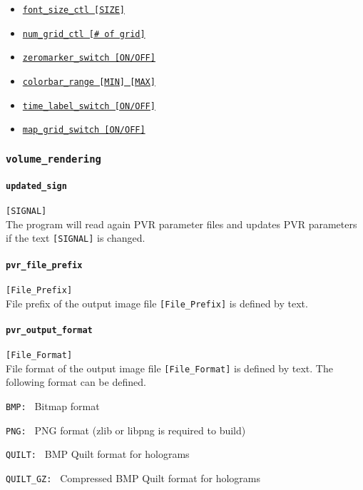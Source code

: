 \begin{itemize}
\begin{itemize}
					{\tt colorbar\_scale\_ctl    [ON/OFF]}
			\item \hyperref[href_t:font_size_ctl]
					{\tt font\_size\_ctl    [SIZE]}
			\item \hyperref[href_t:num_grid_ctl]
					{\tt num\_grid\_ctl    [\# of grid]}
			\item \hyperref[href_t:zeromarker_switch]
					{\tt zeromarker\_switch    [ON/OFF]}
			\item \hyperref[href_t:colorbar_range]
					{\tt colorbar\_range    [MIN]  [MAX]}
			\item \hyperref[href_t:time_label_switch]
					{\tt time\_label\_switch    [ON/OFF]}
			\item \hyperref[href_t:map_grid_switch]
					{\tt map\_grid\_switch    [ON/OFF]}
		\end{itemize}
\end{itemize}



\subsubsection{\tt volume\_rendering}
\label{href_t:volume_rendering}
%
\paragraph{\tt updated\_sign}
\label{href_t:updated_sign}  
\verb|[SIGNAL]| \\
The program will read again PVR parameter files and updates PVR parameters if the text \verb|[SIGNAL]| is changed. 
%
\paragraph{\tt pvr\_file\_prefix}
\label{href_t:pvr_file_prefix}  
\verb|[File_Prefix]| \\
File prefix of the output image file  \verb|[File_Prefix]| is defined by text. 
%
\paragraph{\tt pvr\_output\_format}
\label{href_t:pvr_output_format}  
\verb|[File_Format]| \\
File format of the output image file  \verb|[File_Format]| is defined by text.  The following format can be defined.
\begin{description}
\item{\tt BMP: }               Bitmap format
\item{\tt PNG: }               PNG format  (zlib or libpng is required to build)
\item{\tt QUILT: }             BMP Quilt format for holograms
\item{\tt QUILT\_GZ: }      Compressed BMP Quilt format for holograms
\end{description}
%
